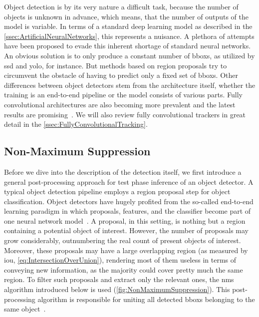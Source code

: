 Object detection is by its very nature a difficult task, because the number of objects is unknown in advance, which means, that the number of outputs of the model is variable. In terms of a standard deep learning model as described in the \cref{ssec:ArtificialNeuralNetworks}, this represents a nuisance. A plethora of attempts have been proposed to evade this inherent shortage of standard neural networks. An obvious solution is to only produce a constant number of \glspl{bbox}, as utilized by \gls{ssd} and \gls{yolo}, for instance. But methods based on region proposals try to circumvent the obstacle of having to predict only a fixed set of \glspl{bbox}. Other differences between object detectors stem from the architecture itself, whether the training is an end-to-end pipeline or the model consists of various parts. Fully convolutional architectures are also becoming more prevalent and the latest results are promising~\cite{Tian2019}. We will also review fully convolutional trackers in great detail in the \cref{ssec:FullyConvolutionalTracking}.

\subsection{Non-Maximum Suppression}
\label{ssec:NonMaximumSuppression}

Before we dive into the description of the detection itself, we first introduce a general post-processing approach for test phase inference of an object detector. A typical object detection pipeline employs a region proposal step for object classification. Object detectors have hugely profited from the so-called end-to-end learning paradigm in which proposals, features, and the classifier become part of one neural network model~\cite{Hosang2017}. A proposal, in this setting, is nothing but a region containing a potential object of interest. However, the number of proposals may grow considerably, outnumbering the real count of present objects of interest. Moreover, these proposals may have a large overlapping region (as measured by \gls{iou}, \cref{eq:IntersectionOverUnion}), rendering most of them useless in terms of conveying new information, as the majority could cover pretty much the same region. To filter such proposals and extract only the relevant ones, the \gls{nms} algorithm introduced below is used (\cref{fig:NonMaximumSuppression}). This post-processing algorithm is responsible for uniting all detected \glspl{bbox} belonging to the same object~\cite{Hosang2017}.

